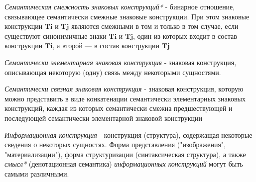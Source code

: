 \textit{Семантическая смежность знаковых конструкций*} - бинарное отношение, связывающее семантически смежные знаковые конструкции. При этом знаковые конструкции $\bm{Ti}$ и $\bm{Tj}$ являются смежными в том и только в том случае, если существуют синонимичные знаки $\bm{Ti}$ и $\bm{Tj}$, один из которых входит в состав конструкции $\bm{Ti}$, а второй — в состав конструкции $\bm{Tj}$

\begin{SCn}


\end{SCn}

\textit{Семантически элементарная знаковая конструкция} - знаковая конструкция, описывающая некоторую (одну) связь между некоторыми сущностями.

\textit{Семантически связная знаковая конструкция} - знаковая конструкция, которую можно представить в виде конкатенации семантически элементарных знаковых конструкций, каждая из которых семантически смежна предшествующей и последующей семантически элементарной знаковой конструкции

\begin{SCn}

    \begin{scnindent}
    \end{scnindent}
    \begin{scnindent}
    \end{scnindent}

\end{SCn}

\textit{Информационная конструкция} - конструкция (структура), содержащая некоторые сведения о некоторых сущностях. Форма представления ("изображения"{}, "материализации"{}), форма структуризации (синтаксическая структура), а также \textit{смысл*} (денотационная семантика) \textit{информационных конструкций} могут быть самыми различными.

